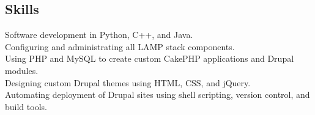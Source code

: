 \documentclass[margin,line]{resume}
\begin{document}
\begin{resume}
    \section{\mysidestyle Skills} 

    Software development in Python, C++, and Java.\vspace{1mm}\\%
    Configuring and administrating all LAMP stack components.\vspace{1mm}\\%
    Using PHP and MySQL to create custom CakePHP applications and Drupal modules.\vspace{1mm}\\%
    Designing custom Drupal themes using HTML, CSS, and jQuery.\vspace{1mm}\\%
    Automating deployment of Drupal sites using shell scripting, version control, and build tools.\vspace{1mm}\\%

\end{resume}
\end{document}
